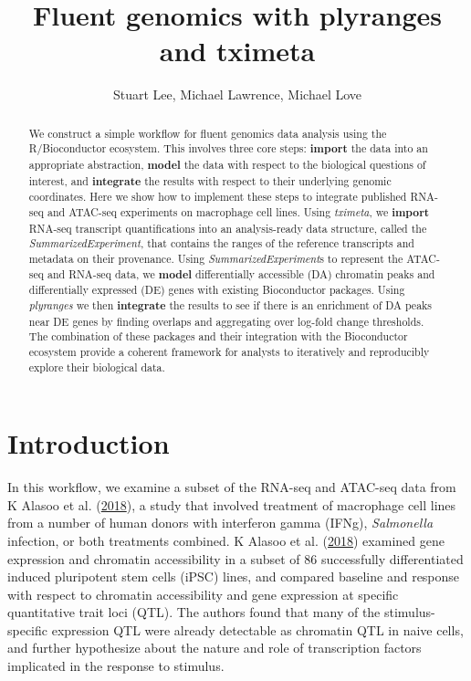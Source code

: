 \documentclass[
]{article}
\title{Fluent genomics with plyranges and tximeta}
\author{Stuart Lee, Michael Lawrence, Michael Love}
\date{}
\begin{document}
\maketitle
\begin{abstract}
We construct a simple workflow for fluent genomics data analysis using the R/Bioconductor ecosystem. This involves three core steps: \textbf{import} the data into an appropriate abstraction, \textbf{model} the data with respect to the biological questions of interest, and \textbf{integrate} the results with respect to their underlying genomic coordinates. Here we show how to implement these steps to integrate published RNA-seq and ATAC-seq experiments on macrophage cell lines. Using \emph{tximeta}, we \textbf{import} RNA-seq transcript quantifications into an analysis-ready data structure, called the \emph{SummarizedExperiment}, that contains the ranges of the reference transcripts and metadata on their provenance. Using \emph{SummarizedExperiment}s to represent the ATAC-seq and RNA-seq data, we \textbf{model} differentially accessible (DA) chromatin peaks and differentially expressed (DE) genes with existing Bioconductor packages. Using \emph{plyranges} we then \textbf{integrate} the results to see if there is an enrichment of DA peaks near DE genes by finding overlaps and aggregating over log-fold change thresholds. The combination of these packages and their integration with the Bioconductor ecosystem provide a coherent framework for analysts to iteratively and reproducibly explore their biological data.
\end{abstract}



























\hypertarget{introduction}{%
\section{Introduction}\label{introduction}}

In this workflow, we examine a subset of the RNA-seq and ATAC-seq data from
K Alasoo et al. (\protect\hyperlink{ref-alasoo}{2018}), a study that involved treatment of macrophage cell lines from a number
of human donors with interferon gamma (IFNg), \emph{Salmonella} infection, or both
treatments combined. K Alasoo et al. (\protect\hyperlink{ref-alasoo}{2018}) examined gene expression and chromatin
accessibility in a subset of 86 successfully differentiated induced pluripotent
stem cells (iPSC) lines, and compared baseline and response with respect to
chromatin accessibility and gene expression at specific quantitative trait loci
(QTL). The authors found that many of the stimulus-specific expression QTL were
already detectable as chromatin QTL in naive cells, and further hypothesize
about the nature and role of transcription factors implicated in the response
to stimulus.
\end{document}
